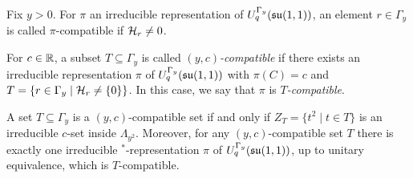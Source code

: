 \begin{Def} Fix $y>0$. For $\pi$ an irreducible representation of $U_q^{\Gamma_y}(\mathfrak{su}(1,1))$, an element $r\in \Gamma_y$ is called $\pi$-compatible if $\mathcal{H}_r\neq 0$. 

For $c\in \mathbb{R}$, a subset $T\subseteq \Gamma_y$ is called \emph{$(y,c)$-compatible} if there exists an irreducible representation $\pi$ of $U_q^{\Gamma_y}(\mathfrak{su}(1,1))$ with $\pi(C) = c$ and $T=\{r\in \Gamma_y\mid \mathcal{H}_{r}\neq \{0\}\}$. In this case, we say that $\pi$ is \emph{$T$-compatible}.
\end{Def}

\begin{Prop}\label{PropClassRep} A set $T\subseteq \Gamma_y$ is a $(y,c)$-compatible set if and only if $Z_T = \{t^2\mid t\in T\}$ is an irreducible $c$-set inside $\Lambda_{y^2}$. Moreover, for any $(y,c)$-compatible set $T$ there is exactly one irreducible $^*$-representation $\pi$ of $U_q^{\Gamma_y}(\mathfrak{su}(1,1))$, up to unitary equivalence, which is $T$-compatible.
\end{Prop}

